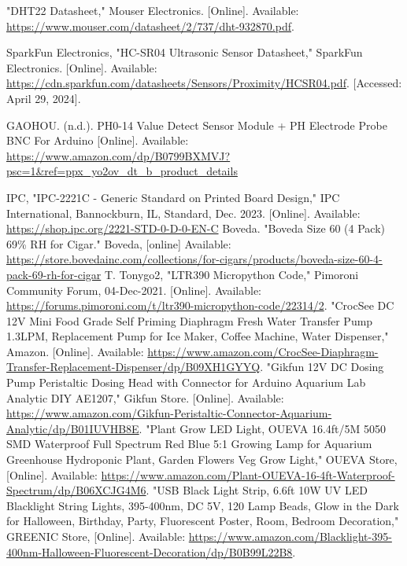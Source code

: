 \documentclass[12pt]{article} %
\begin{document}
\begin{thebibliography}{99}

     "DHT22 Datasheet," Mouser Electronics. [Online]. Available: \url{https://www.mouser.com/datasheet/2/737/dht-932870.pdf}.

     SparkFun Electronics, "HC-SR04 Ultrasonic Sensor Datasheet," SparkFun Electronics. [Online]. Available: \url{https://cdn.sparkfun.com/datasheets/Sensors/Proximity/HCSR04.pdf}. [Accessed: April 29, 2024].

    
     GAOHOU. (n.d.). PH0-14 Value Detect Sensor Module + PH Electrode Probe BNC For Arduino [Online]. Available: \url{https://www.amazon.com/dp/B0799BXMVJ?psc=1&ref=ppx_yo2ov_dt_b_product_details}
    
     IPC, "IPC-2221C - Generic Standard on Printed Board Design," IPC International, Bannockburn, IL, Standard, Dec. 2023. [Online]. Available: \url{https://shop.ipc.org/2221-STD-0-D-0-EN-C}
     Boveda. "Boveda Size 60 (4 Pack) 69\% RH for Cigar." Boveda, [online] Available: \url{https://store.bovedainc.com/collections/for-cigars/products/boveda-size-60-4-pack-69-rh-for-cigar} 
     T. Tonygo2, "LTR390 Micropython Code," Pimoroni Community Forum, 04-Dec-2021. [Online]. Available: \url{https://forums.pimoroni.com/t/ltr390-micropython-code/22314/2}.
     "CrocSee DC 12V Mini Food Grade Self Priming Diaphragm Fresh Water Transfer Pump 1.3LPM, Replacement Pump for Ice Maker, Coffee Machine, Water Dispenser," Amazon. [Online]. Available: \url{https://www.amazon.com/CrocSee-Diaphragm-Transfer-Replacement-Dispenser/dp/B09XH1GYYQ}. 
     "Gikfun 12V DC Dosing Pump Peristaltic Dosing Head with Connector for Arduino Aquarium Lab Analytic DIY AE1207," Gikfun Store. [Online]. Available: \url{https://www.amazon.com/Gikfun-Peristaltic-Connector-Aquarium-Analytic/dp/B01IUVHB8E}. 
     "Plant Grow LED Light, OUEVA 16.4ft/5M 5050 SMD Waterproof Full Spectrum Red Blue 5:1 Growing Lamp for Aquarium Greenhouse Hydroponic Plant, Garden Flowers Veg Grow Light," OUEVA Store, [Online]. Available: \url{https://www.amazon.com/Plant-OUEVA-16-4ft-Waterproof-Spectrum/dp/B06XCJG4M6}.
     "USB Black Light Strip, 6.6ft 10W UV LED Blacklight String Lights, 395-400nm, DC 5V, 120 Lamp Beads, Glow in the Dark for Halloween, Birthday, Party, Fluorescent Poster, Room, Bedroom Decoration," GREENIC Store, [Online]. Available: \url{https://www.amazon.com/Blacklight-395-400nm-Halloween-Fluorescent-Decoration/dp/B0B99L22B8}.

\end{thebibliography}
\end{document}
